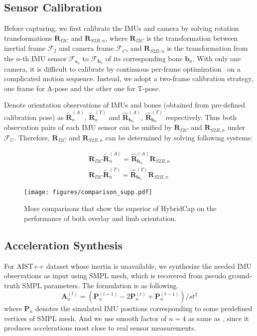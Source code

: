 \documentclass[letterpaper]{article} \usepackage{aaai23}  \usepackage{times}  \usepackage{helvet}  \usepackage{courier}  \usepackage[hyphens]{url}  \usepackage{graphicx} \urlstyle{rm} \def\UrlFont{\rm}  \usepackage{natbib}  \usepackage{caption} \frenchspacing  \setlength{\pdfpagewidth}{8.5in}  \setlength{\pdfpageheight}{11in}  \usepackage{algorithm}
\begin{document}
\subsection{Sensor Calibration}
Before capturing, we first calibrate the IMUs and camera by solving rotation transformations $\mathbf{R}_{I2C}$ and $\mathbf{R}_{S2B,n}$, where $\mathbf{R}_{I2C}$ is the transformation between inertial frame $\mathcal{F}_I$ and camera frame $\mathcal{F}_C$, and $\mathbf{R}_{S2B,n}$ is the transformation from the $n$-th IMU sensor $\mathcal{F}_{\textbf{s}_n}$ to $\mathcal{F}_{\textbf{b}_n}$ of its corresponding bone $\textbf{b}_n$. 
With only one camera, it is difficult to calibrate by continuous per-frame optimization~\cite{Zheng2018HybridFusion} on a complicated motion sequence. 
Instead, we adopt a two-frame calibration strategy, one frame for A-pose and the other one for T-pose.

Denote orientation observations of IMUs and bones (obtained from pre-defined calibration pose) as $\mathbf{\widetilde{R}}_n^{(A)}$, $\mathbf{\widetilde{R}}_n^{(T)}$ and $\mathbf{\hat{R}}_{\textbf{b}_n}^{(A)}$, $\mathbf{\hat{R}}_{\textbf{b}_n}^{(T)}$ respectively. Thus both observation pairs of each IMU sensor can be unified by $\mathbf{R}_{I2C}$ and $\mathbf{R}_{S2B,n}$ under $\mathcal{F}_C$. Therefore, $\mathbf{R}_{I2C}$ and $\mathbf{R}_{S2B,n}$ can be determined by solving following systems:



\begin{align}
    \mathbf{R}_{I2C}\mathbf{\widetilde{R}}_n^{(A)} = \mathbf{\hat{R}}_{\textbf{b}_n}^{(A)}\mathbf{R}_{S2B,n}\\
    \mathbf{R}_{I2C}\mathbf{\widetilde{R}}_n^{(T)} = \mathbf{\hat{R}}_{\textbf{b}_n}^{(T)}\mathbf{R}_{S2B,n}
\end{align}


\begin{figure*}[t]
	\centering
	\texttt{[image: figures/comparison\_supp.pdf]}
	\caption{More comparisons that show the superior of HybridCap on the performance of both overlay and limb orientation.}
	\label{fig:comp}
	\vspace{-2mm}
\end{figure*}


\vspace{-2mm}
\subsection{Acceleration Synthesis}
For AIST++ \cite{li2021learn, aist-dance-db} dataset whose inertia is unavailable, we synthesize the needed IMU observations as input using SMPL \cite{SMPL2015} mesh, which is recovered from pseudo ground-truth SMPL parameters. The formulation is as following. 
\begin{equation}
    \mathbf{A}_n^{(t)} = (\mathbf{P}_n^{(t+1)} - 2\mathbf{P}_n^{(t)} + \mathbf{P}_n^{(t-1)}) / st^2
    \label{eq:acceleration}
\end{equation}
where $\mathbf{P}_n$ denotes the simulated IMU positions corresponding to some predefined vertices of SMPL mesh.
And we use smooth factor of $n=4$ as same as \cite{TransPose2021}, since it produces accelerations most close to real sensor measurements. 
\end{document}
